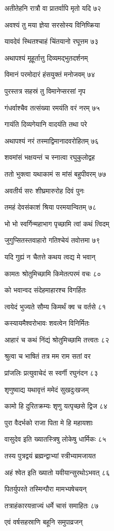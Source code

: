 अतीतेहनि रात्रौ वा प्रातर्वापि मृतो यदि ७२

अवश्यं तु मया ज्ञेया सरसोस्य विनिष्क्रिया

यावदेवं स्थितश्चाहं चिंतयानो रघूत्तम ७३

अथापश्यं मूहूर्तात्तु दिव्यमद्भुतदर्शनम्

विमानं परमोदारं हंसयुक्तं मनोजवम् ७४

पुरस्तत्र सहस्रं तु विमानेप्सरसां नृप

गंधर्वाश्चैव तत्संख्या रमयंति वरं नरम् ७५

गायंति दिव्यगेयानि वादयंति तथा परे

अथापश्यं नरं तस्माद्विमानादवरोहितम् ७६

शवमांसं भक्षयन्तं च स्नात्वा रघुकुलोद्वह

ततो भुक्त्वा यथाकामं स मांसं बहुपीवरम् ७७

अवतीर्य सरः शीघ्रमारुरोह दिवं पुनः

तमहं देवसंकाशं श्रिया परमयान्वितम् ७८

भो भो स्वर्गिन्महाभाग पृच्छामि त्वां कथं त्विदम्

जुगुप्सितस्तवाहारो गतिश्चेयं तवोत्तमा ७९

यदि गुह्यं न चैतत्ते कथय त्वद्य मे भवान्

कामतः श्रोतुमिच्छामि किमेतत्परमं वचः ८०

को भवान्वद संदेहमाहारश्च विगर्हितः

त्वयेदं भुज्यते सौम्य किमर्थं क्व च वर्तसे ८१

कस्यायमैश्वरोभावः शवत्वेन विनिर्मितः

आहारं च कथं निंद्यं श्रोतुमिच्छामि तत्त्वतः ८२

श्रुत्वा च भाषितं तत्र मम राम सतां वर

प्रांजलिः प्रत्युवाचेदं स स्वर्गी रघुनंदन ८३

शृणुष्वाद्य यथावृत्तं ममेदं सुखदुःखजम्

कामो हि दुरितक्रम्यः शृणु यत्पृच्छसे द्विज ८४

पुरा वैदर्भको राजा पिता मे हि महायशाः

वासुदेव इति ख्यातस्त्रिषु लोकेषु धार्मिकः ८५

तस्य पुत्रद्वयं ब्रह्मन्द्वाभ्यां स्त्रीभ्यामजायत

अहं श्वेत इति ख्यातो यवीयान्सुरथोऽभवत् ८६

पितर्युपरते तस्मिन्पौरा मामभ्यषेचयन्

तत्राहंकारयन्राज्यं धर्मे चासं समाहितः ८७

एवं वर्षसहस्राणि बहूनि समुपाव्रजन्

